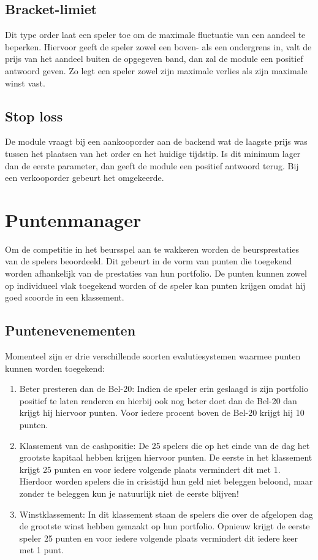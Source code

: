 \section{Bracket-limiet}
Dit type order laat een speler toe om de maximale fluctuatie van een aandeel te beperken. Hiervoor geeft de speler zowel een boven- als een ondergrens in, valt de prijs van het aandeel buiten de opgegeven band, dan zal de module een positief antwoord geven. Zo legt een speler zowel zijn maximale verlies als zijn maximale winst vast.

\section{Stop loss}
De module vraagt bij een aankooporder aan de backend wat de laagste prijs was tussen het plaatsen van het order en het huidige tijdstip. Is dit minimum lager dan de eerste parameter, dan geeft de module een positief antwoord terug. Bij een verkooporder gebeurt het omgekeerde.

%
%

\chapter{Puntenmanager}

Om de competitie in het beursspel aan te wakkeren worden de beursprestaties van de spelers beoordeeld. Dit gebeurt in de vorm van punten die toegekend worden afhankelijk van de prestaties van hun portfolio. De punten kunnen zowel op individueel vlak toegekend worden of de speler kan punten krijgen omdat hij goed scoorde in een klassement.

\section{Puntenevenementen}

Momenteel zijn er drie verschillende soorten evalutiesystemen waarmee punten kunnen worden toegekend:

\begin{enumerate}
\item Beter presteren dan de Bel-20: Indien de speler erin geslaagd is zijn portfolio positief te laten renderen en hierbij ook nog beter doet dan de Bel-20 dan krijgt hij hiervoor punten. Voor iedere procent boven de Bel-20 krijgt hij 10 punten.
\item Klassement van de cashpositie: De 25 spelers die op het einde van de dag het grootste kapitaal hebben krijgen hiervoor punten. De eerste in het klassement krijgt 25 punten en voor iedere volgende plaats vermindert dit met 1. Hierdoor worden spelers die in crisistijd hun geld niet beleggen beloond, maar zonder te beleggen kun je natuurlijk niet de eerste blijven!
\item Winstklassement: In dit klassement staan de spelers die over de afgelopen dag de grootste winst hebben gemaakt op hun portfolio. Opnieuw krijgt de eerste speler 25 punten en voor iedere volgende plaats vermindert dit iedere keer met 1 punt.
\end{enumerate}

